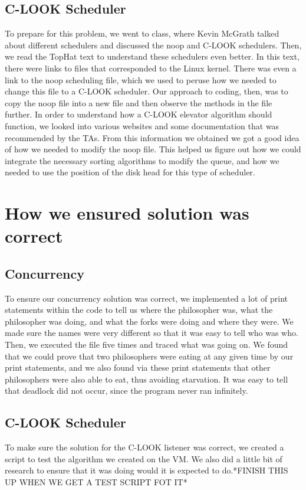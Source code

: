 \documentclass[letterpaper,10pt,titlepage]{article}
\begin{document}
\subsection{C-LOOK Scheduler}
To prepare for this problem, we went to class, where Kevin McGrath talked about different schedulers and discussed the noop and C-LOOK schedulers. Then, we read the TopHat text to understand these schedulers even better. In this text, there were links to files that corresponded to the Linux kernel. There was even a link to the noop scheduling file, which we used to peruse how we needed to change this file to a C-LOOK scheduler. Our approach to coding, then, was to copy the noop file into a new file and then observe the methods in the file further. In order to understand how a C-LOOK elevator algorithm should function, we looked into various websites and some documentation that was recommended by the TAs. From this information we obtained we got a good idea of how we needed to modify the noop file. This helped us figure out how we could integrate the necessary sorting algorithms to modify the queue, and how we needed to use the position of the disk head for this type of scheduler.

\section{How we ensured solution was correct}
\subsection{Concurrency}
To ensure our concurrency solution was correct, we implemented a lot of print statements within the code to tell us where the philosopher was, what the philosopher was doing, and what the forks were doing and where they were. We made sure the names were very different so that it was easy to tell who was who. Then, we executed the file five times and traced what was going on. We found that we could prove that two philosophers were eating at any given time by our print statements, and we also found via these print statements that other philosophers were also able to eat, thus avoiding starvation. It was easy to tell that deadlock did not occur, since the program never ran infinitely.  

\subsection{C-LOOK Scheduler}
To make sure the solution for the C-LOOK listener was correct, we created a script to test the algorithm we created on the VM. We also did a little bit of research to ensure that it was doing would it is expected to do.*FINISH THIS UP WHEN WE GET A TEST SCRIPT FOT IT*
\end{document}
